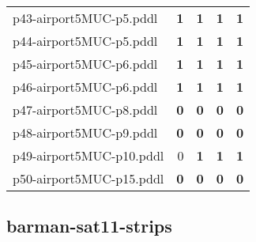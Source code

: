 \documentclass{article}
\begin{document}
\begin{tabular}{@{}lrrrr@{}}
p43-airport5MUC-p5.pddl & \textbf{1} & \textbf{1} & \textbf{1} & \textbf{1} \\
p44-airport5MUC-p5.pddl & \textbf{1} & \textbf{1} & \textbf{1} & \textbf{1} \\
p45-airport5MUC-p6.pddl & \textbf{1} & \textbf{1} & \textbf{1} & \textbf{1} \\
p46-airport5MUC-p6.pddl & \textbf{1} & \textbf{1} & \textbf{1} & \textbf{1} \\
p47-airport5MUC-p8.pddl & \textbf{0} & \textbf{0} & \textbf{0} & \textbf{0} \\
p48-airport5MUC-p9.pddl & \textbf{0} & \textbf{0} & \textbf{0} & \textbf{0} \\
p49-airport5MUC-p10.pddl & 0 & \textbf{1} & \textbf{1} & \textbf{1} \\
p50-airport5MUC-p15.pddl & \textbf{0} & \textbf{0} & \textbf{0} & \textbf{0} \\
\end{tabular}

\hypertarget{coverage-barman-sat11-strips}{}
\subsection*{barman-sat11-strips}
\end{document}
